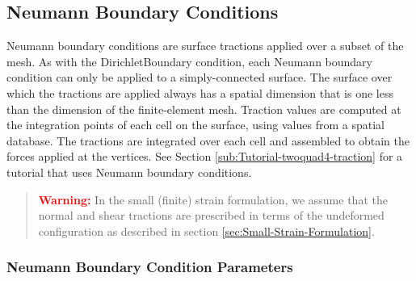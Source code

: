 \subsection{Neumann Boundary Conditions}

Neumann boundary conditions are surface tractions applied over a subset
of the mesh. As with the DirichletBoundary condition, each Neumann
boundary condition can only be applied to a simply-connected surface.
The surface over which the tractions are applied always has a spatial
dimension that is one less than the dimension of the finite-element
mesh. Traction values are computed at the integration points of each
cell on the surface, using values from a spatial database. The tractions
are integrated over each cell and assembled to obtain the forces applied
at the vertices. See Section \ref{sub:Tutorial-twoquad4-traction}
for a tutorial that uses Neumann boundary conditions.
\begin{quote}
\textbf{\textcolor{red}{Warning:}}\textbf{ }In the small (finite)
strain formulation, we assume that the normal and shear tractions
are prescribed in terms of the undeformed configuration as described
in section \ref{sec:Small-Strain-Formulation}.
\end{quote}

\subsubsection{Neumann Boundary Condition Parameters}

